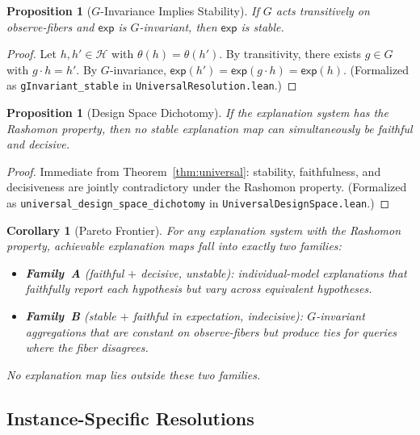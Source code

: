 \documentclass[11pt,a4paper]{article}
\newtheorem{corollary}[theorem]{Corollary}
\newtheorem{proposition}[theorem]{Proposition}
\newcommand{\sH}{\mathcal{H}}
\begin{document}
\begin{proposition}[$G$-Invariance Implies Stability]
\label{prop:g-invariant-stable}
If $G$ acts transitively on observe-fibers and $\mathsf{exp}$ is
$G$-invariant, then $\mathsf{exp}$ is stable.
\end{proposition}

\begin{proof}
Let $h, h' \in \sH$ with $\theta(h) = \theta(h')$.  By transitivity, there
exists $g \in G$ with $g \cdot h = h'$.  By $G$-invariance,
$\mathsf{exp}(h') = \mathsf{exp}(g \cdot h) = \mathsf{exp}(h)$.
(Formalized as \texttt{gInvariant\_stable} in
\texttt{UniversalResolution.lean}.)
\end{proof}

\begin{proposition}[Design Space Dichotomy]
\label{prop:dichotomy}
If the explanation system has the Rashomon property, then no stable
explanation map can simultaneously be faithful and decisive.
\end{proposition}

\begin{proof}
Immediate from Theorem~\ref{thm:universal}: stability, faithfulness, and
decisiveness are jointly contradictory under the Rashomon property.
(Formalized as \texttt{universal\_design\_space\_dichotomy} in
\texttt{UniversalDesignSpace.lean}.)
\end{proof}

\begin{corollary}[Pareto Frontier]
\label{cor:pareto}
For any explanation system with the Rashomon property, achievable
explanation maps fall into exactly two families:
\begin{itemize}
  \item \textbf{Family~A} (faithful $+$ decisive, unstable): individual-model
    explanations that faithfully report each hypothesis but vary across
    equivalent hypotheses.
  \item \textbf{Family~B} (stable $+$ faithful in expectation, indecisive):
    $G$-invariant aggregations that are constant on observe-fibers but
    produce ties for queries where the fiber disagrees.
\end{itemize}
No explanation map lies outside these two families.
\end{corollary}

\subsection{Instance-Specific Resolutions}
\label{sec:resolution-instances}
\end{document}
